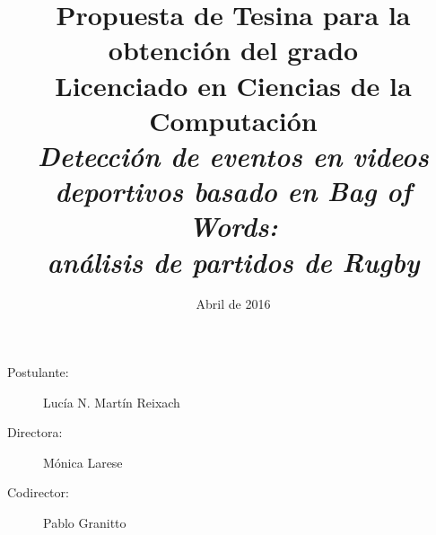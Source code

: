 \documentclass[10pt]{article}
\begin{document}
\date{Abril de 2016}
\title{Propuesta de Tesina para la obtención del grado\\Licenciado en Ciencias de la Computación
\\\textit{Detección de eventos en videos deportivos basado en Bag of Words:\\análisis de partidos de Rugby}}

\maketitle

\begin{description}
  \item[Postulante:] Lucía N. Martín Reixach
  \item[Directora:] Mónica Larese
  \item[Codirector:] Pablo Granitto
\end{description}












\nocite{yang2007evaluating}
\printbibliography

%
\end{document}
